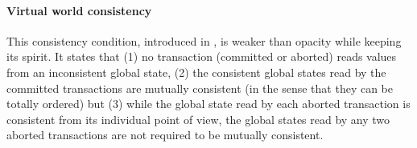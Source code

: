 

\paragraph{Virtual world consistency}
This consistency condition, introduced in \cite{IR09},  is 
weaker  than  opacity while  keeping  its spirit.  It  states  that (1)  no
transaction (committed or aborted)  reads values from an inconsistent global
state, (2)  the consistent global states read by the committed transactions 
are   mutually consistent (in the sense that they can be totally  ordered)  
but    (3)  while the  global  state read  by each aborted transaction  is
consistent from its individual point  of view, the  global states read by
any two aborted  transactions are not  required to be  mutually consistent.  

% 



